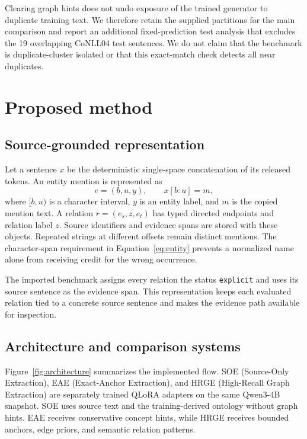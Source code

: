 \documentclass[preprint,12pt]{elsarticle}
\begin{document}
Clearing graph hints does not undo exposure of the trained generator to
duplicate training text. We therefore retain the supplied partitions for the
main comparison and report an additional fixed-prediction test analysis that
excludes the 19 overlapping CoNLL04 test sentences. We do not claim that the
benchmark is duplicate-cluster isolated or that this exact-match check detects
all near duplicates.

\section{Proposed method}
\label{sec:method}
\subsection{Source-grounded representation}
Let a sentence $x$ be the deterministic single-space concatenation of its
released tokens. An entity mention is represented as
\begin{equation}
e=(b,u,y),\qquad x[b:u]=m,
\label{eq:entity}
\end{equation}
where $[b,u)$ is a character interval, $y$ is an entity label, and $m$ is the
copied mention text. A relation $r=(e_s,z,e_t)$ has typed directed endpoints
and relation label $z$. Source identifiers and evidence spans are stored with
these objects. Repeated strings at different offsets remain distinct mentions.
The character-span requirement in Equation~\eqref{eq:entity} prevents a
normalized name alone from receiving credit for the wrong occurrence.

The imported benchmark assigns every relation the status \texttt{explicit}
and uses its source sentence as the evidence span. This representation keeps
each evaluated relation tied to a concrete source sentence and makes the
evidence path available for inspection.

\subsection{Architecture and comparison systems}
Figure~\ref{fig:architecture} summarizes the implemented flow. SOE
(Source-Only Extraction), EAE (Exact-Anchor Extraction), and HRGE (High-Recall
Graph Extraction) are separately trained QLoRA adapters on the same Qwen3-4B
snapshot. SOE uses source text and the training-derived ontology without graph
hints. EAE receives conservative concept hints, while HRGE receives bounded
anchors, edge priors, and semantic relation patterns.
\end{document}
